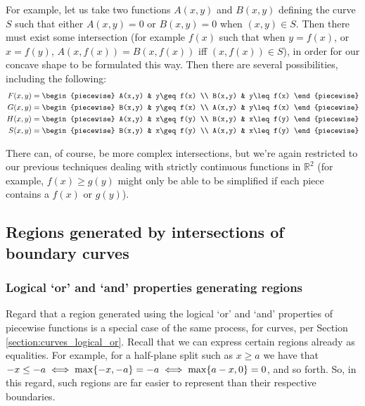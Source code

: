 For example, let us take two functions $A(x,y)$ and $B(x,y)$ defining the curve $S$ such that either $A(x,y)=0$ or $B(x,y)=0$ when $(x,y)\in S$. Then there must exist some intersection (for example $f(x)$ such that when $y=f(x)$, or $x=f(y)$, $A(x,f(x))=B(x,f(x))$ iff $(x,f(x))\in S$), in order for our concave shape to be formulated this way. Then there are several possibilities, including the following:
\begin{align*}
    F(x,y) &= \begin{piecewise}
        A(x,y) & y\geq f(x) \\
        B(x,y) & y\leq f(x)
    \end{piecewise} \\
    G(x,y) &= \begin{piecewise}
        B(x,y) & y\geq f(x) \\
        A(x,y) & y\leq f(x)
    \end{piecewise} \\
    H(x,y) &= \begin{piecewise}
        A(x,y) & x\geq f(y) \\
        B(x,y) & x\leq f(y)
    \end{piecewise} \\
    S(x,y) &= \begin{piecewise}
        B(x,y) & x\geq f(y) \\
        A(x,y) & x\leq f(y)
    \end{piecewise} \\
\end{align*}

There can, of course, be more complex intersections, but we're again restricted to our previous techniques dealing with strictly continuous functions in $\mathbb{R}^2$ (for example, $f(x)\geq g(y)$ might only be able to be simplified if each piece contains a $f(x)$ or $g(y)$).

\subsection{Regions generated by intersections of boundary curves}
\subsubsection{Logical `or' and `and' properties generating regions}
Regard that a region generated using the logical `or' and `and' properties of piecewise functions is a special case of the same process, for curves, per Section \ref{section:curves_logical_or}. Recall that we can express certain regions already as equalities. For example, for a half-plane split such as $x\geq a$ we have that $-x\leq -a\iff\max\{-x,-a\}=-a\iff\max\{a-x,0\}=0$, and so forth. So, in this regard, such regions are far easier to represent than their respective boundaries.


